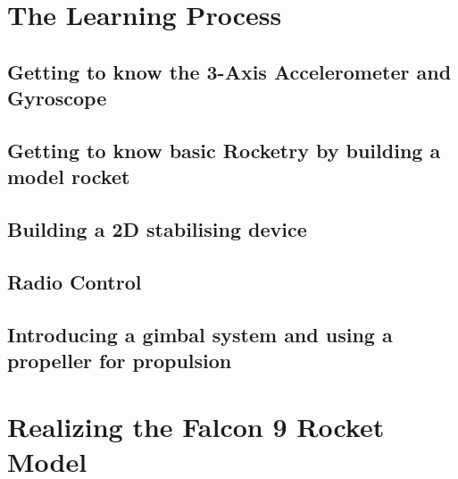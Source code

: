 \documentclass[a4paper,10pt]{article} %
\begin{document}
\newpage
\section{The Learning Process}

\subsection{Getting to know the 3-Axis Accelerometer and Gyroscope}

\newpage
\subsection{Getting to know basic Rocketry by building a model rocket}

\newpage
\subsection{Building a 2D stabilising device}

\newpage
\subsection{Radio Control}

\newpage
\subsection{Introducing a gimbal system and using a propeller
for propulsion}

\newpage
\section{Realizing the Falcon 9 Rocket Model}
\end{document}
